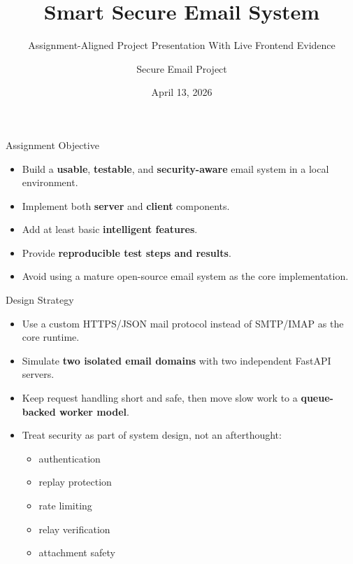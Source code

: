 \documentclass[aspectratio=169]{beamer}
\title{Smart Secure Email System}
\subtitle{Assignment-Aligned Project Presentation With Live Frontend Evidence}
\author{Secure Email Project}
\date{April 13, 2026}
\begin{document}
\begin{frame}
  \titlepage
\end{frame}

\begin{frame}{Assignment Objective}
  \begin{itemize}
    \item Build a \textbf{usable}, \textbf{testable}, and \textbf{security-aware} email system in a local environment.
    \item Implement both \textbf{server} and \textbf{client} components.
    \item Add at least basic \textbf{intelligent features}.
    \item Provide \textbf{reproducible test steps and results}.
    \item Avoid using a mature open-source email system as the core implementation.
  \end{itemize}
\end{frame}

\begin{frame}{Design Strategy}
  \begin{itemize}
    \item Use a custom HTTPS/JSON mail protocol instead of SMTP/IMAP as the core runtime.
    \item Simulate \textbf{two isolated email domains} with two independent FastAPI servers.
    \item Keep request handling short and safe, then move slow work to a \textbf{queue-backed worker model}.
    \item Treat security as part of system design, not an afterthought:
    \begin{itemize}
      \item authentication
      \item replay protection
      \item rate limiting
      \item relay verification
      \item attachment safety
    \end{itemize}
  \end{itemize}
\end{frame}
\end{document}
